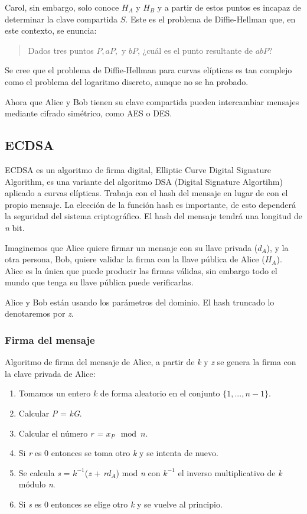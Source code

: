 \documentclass[11pt]{article}
\begin{document}
Carol, sin embargo, solo conoce $H_A$ y $H_B$ y a partir de estos puntos es incapaz de determinar la clave compartida $S$. Este es el problema de Diffie-Hellman que, en este contexto, se enuncia:

\begin{quote}
  Dados tres puntos $P, aP,$ y $bP$, ¿cuál es el punto resultante de $abP$?
\end{quote}

Se cree que el problema de Diffie-Hellman para curvas elípticas es tan complejo como el problema del logaritmo discreto, aunque no se ha probado.

Ahora que Alice y Bob tienen su clave compartida pueden intercambiar mensajes mediante cifrado simétrico, como AES o DES.

\subsection{ECDSA}

ECDSA es un algoritmo de firma digital, Elliptic Curve Digital Signature Algorithm, es una variante del algoritmo DSA (Digital Signature Algortihm) aplicado a curvas elípticas. Trabaja con el hash del mensaje en lugar de con el propio mensaje. La elección de la función hash es importante, de esto dependerá la seguridad del sistema criptográfico. El hash del mensaje tendrá una longitud de \textit{n} bit.

Imaginemos que Alice quiere firmar un mensaje con su llave privada ($d_{A}$), y la otra persona, Bob, quiere validar la firma con la llave pública de Alice ($H_{A}$). Alice es la única que puede producir las firmas válidas, sin embargo todo el mundo que tenga su llave pública puede verificarlas.

Alice y Bob están usando los parámetros del dominio. El hash truncado lo denotaremos por \textit{z}.

\subsubsection*{Firma del mensaje}
Algoritmo de firma del mensaje de Alice, a partir de \textit{k} y \textit{z} se genera la firma con la clave privada de Alice:


\begin{enumerate}
	\item Tomamos un entero $ k $ de forma aleatorio en el conjunto $ \{ 1, ..., n-1\} $.
	\item Calcular \textit{P} = \textit{kG}.
	\item Calcular el número \textit{r = $x_{P} \mod n$}.
	\item Si \textit{r} es 0 entonces se toma otro \textit{k} y se intenta de nuevo.
	\item Se calcula \textit{s} = \textit{$k^{-1}$}(\textit{z} + \textit{r$d_{A}$}) mod \textit{n}  con \textit{$k^{-1}$} el inverso multiplicativo de \textit{k} módulo \textit{n}.
	\item Si \textit{s} es 0 entonces se elige otro \textit{k} y se vuelve al principio.
\end{enumerate} 
\end{document}
